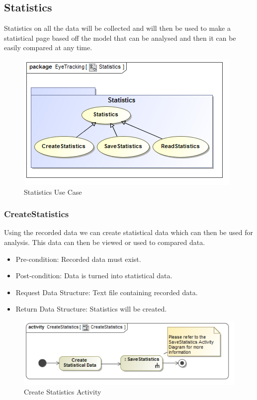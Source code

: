 \subsection{Statistics}
Statistics on all the data will be collected and will then be used to make a statistical page based off the model that can be analysed and then it can be easily compared at any time.
\newline
\begin{figure}[!ht]
	\centering
	\includegraphics[scale=0.5]{Diagrams/Use_Case_Diagram__Statistics.png}
	\caption{Statistics Use Case}
	\end{figure}
	
		\subsubsection{CreateStatistics}
Using the recorded data we can create statistical data which can then be used for analysis. This data can then be viewed or used to compared data.
\begin{itemize}
\item Pre-condition: Recorded data must exist.
\item Post-condition: Data is turned into statistical data.
\item Request Data Structure: Text file containing recorded data.
\item Return Data Structure: Statistics will be created.
\end{itemize}

\begin{figure}[!ht]
	\centering
	\includegraphics[scale=0.5]{Diagrams/Activity_Diagram__CreateStatistics__CreateStatistics.png}
	\caption{Create Statistics Activity}
	\end{figure}
	
